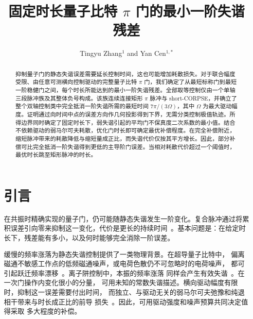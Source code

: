 \documentclass[12pt]{iopjournal}
\renewcommand{\articletype}[1]{\noindent{\small\sffamily\MakeUppercase{#1}}\par\vspace{1em}}
\theoremstyle{definition}
\begin{document}
\articletype{Paper}

\title{固定时长量子比特 \texorpdfstring{$\pi$}{π} 门的最小一阶失谐残差}
\author{Tingyu Zhang$^1$ and Yan Cen$^{1,*}$}





\begin{abstract}
抑制量子门的静态失谐误差需要延长控制时间，这也可能增加耗散损失。对于联合幅度受限、由任意可测横向控制驱动的完整量子比特 $\pi$ 门，我们确定了从最短标称门到最短一阶稳健门之间，每个时长所能达到的最小一阶失谐残差。全部取等控制仅由一个单轴三段脉冲族及其整体负号构成。该族连续连接矩形 $\pi$ 脉冲与 short-CORPSE，并确立了整个双轴控制类中完全抵消一阶失谐所需的最短时间 $7\pi/(3\Omega)$，其中 $\Omega$ 为最大驱动幅度。证明通过向时间中点的误差方向作几何投影得到下界，无需分类控制极值轨迹。所得边界同时确定了固定时长下，弱失谐引起的平均门不保真度二次系数的最小值。结合不依赖驱动的弱马尔可夫耗散，优化门时长即可确定最优补偿程度。在完全补偿附近，缩短脉冲带来的耗散降低与缩短量成正比，而失谐代价仅按其平方增长。因此，部分补偿可比完全抵消一阶失谐得到更低的主导阶门误差。当相对耗散代价超过一个阈值时，最优时长跳至矩形脉冲的时长。
\end{abstract}

\section{引言}

在共振时精确实现的量子门，仍可能随静态失谐发生一阶变化。复合脉冲通过将累积误差引向零来抑制这一变化，代价是更长的持续时间~\cite{cummins2000,cummins2003}。基本问题是：在给定时长下，残差能有多小，以及何时能够完全消除一阶误差。

缓慢的频率涨落为静态失谐控制提供了一类物理背景。在超导量子比特中，
偏离磁通不敏感工作点的低频磁通噪声，或电荷色散仍不可忽略时的电荷噪声，
都可引起跃迁频率漂移~\cite{krantz2019}。离子阱控制中，本振的频率涨落
同样会产生有效失谐~\cite{ball2016}。在一次门操作内变化很小的分量，
可用未知的常数失谐描述。横向驱动幅度有限时，抑制这一误差需要付出时间，
而独立、与驱动无关的弱马尔可夫弛豫和纯退相干带来与时长成正比的前导
损失~\cite{abad2022}。因此，可用驱动强度和噪声预算共同决定值得采取
多大程度的补偿。
\end{document}

